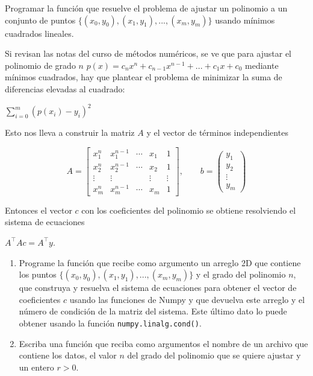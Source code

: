 \documentclass[11pt]{article}
\providecommand{\tightlist}{%
      \setlength{\itemsep}{0pt}\setlength{\parskip}{0pt}}
\begin{document}
Programar la función que resuelve el problema de ajustar un polinomio a
un conjunto de puntos \(\{(x_0, y_0), (x_1, y_1), ..., (x_m, y_m)\}\)
usando mínimos cuadrados lineales.

Si revisan las notas del curso de métodos numéricos, se ve que para
ajustar el polinomio de grado \(n\)
\(p(x) = c_n x^n + c_{n-1} x^{n-1} + ... + c_1 x + c_0\) mediante
mínimos cuadrados, hay que plantear el problema de minimizar la suma de
diferencias elevadas al cuadrado:

\(\sum_{i=0}^{m} (p(x_i) - y_i )^2\)

Esto nos lleva a construir la matriz \(A\) y el vector de términos
independientes

    \[ A = \left[\begin{array}{ccccc}
x_1^n  & x_1^{n-1} & \cdots & x_1 & 1 \\
x_2^n  & x_2^{n-1} & \cdots & x_2 & 1 \\
\vdots & \vdots    &        & \vdots  & \vdots \\
x_m^n  & x_m^{n-1} & \cdots & x_m & 1 
\end{array}\right], \qquad
b =\left( \begin{array}{c}
y_1 \\ y_2 \\ \vdots \\ y_m
\end{array}  
\right)\]

    Entonces el vector \(c\) con los coeficientes del polinomio se obtiene
resolviendo el sistema de ecuaciones

\(A^{\top} A c= A^{\top} y\).

\begin{enumerate}
\def\labelenumi{\arabic{enumi}.}
\tightlist
\item
  Programe la función que recibe como argumento un arreglo 2D que
  contiene los puntos \(\{(x_0, y_0), (x_1, y_1), ..., (x_m, y_m)\}\) y
  el grado del polinomio \(n\), que construya y resuelva el sistema de
  ecuaciones para obtener el vector de coeficientes \(c\) usando las
  funciones de Numpy y que devuelva este arreglo y el número de
  condición de la matriz del sistema. Este último dato lo puede obtener
  usando la función \texttt{numpy.linalg.cond()}.
\item
  Escriba una función que reciba como argumentos el nombre de un archivo
  que contiene los datos, el valor \(n\) del grado del polinomio que se
  quiere ajustar y un entero \(r>0\).
\end{enumerate}
\end{document}
